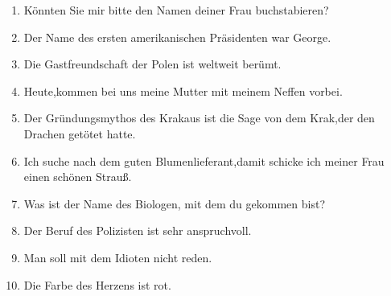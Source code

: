 \documentclass[a4paper,12pt]{article}
\begin{document}
\begin{enumerate}
    \item K\"onnten Sie mir bitte den Namen deiner Frau buchstabieren?
    \item Der Name des ersten amerikanischen Pr\"asidenten war George.
    \item Die Gastfreundschaft der Polen ist weltweit ber\"umt.
    \item Heute,kommen bei uns meine Mutter mit meinem Neffen vorbei.
    \item Der Gr\"undungsmythos des Krakaus ist die Sage von dem Krak,der den Drachen get\"otet hatte.
    \item Ich suche nach dem guten Blumenlieferant,damit schicke ich meiner Frau einen sch\"onen Strau\ss.
    \item Was ist der Name des Biologen, mit dem du gekommen bist?
    \item Der Beruf des Polizisten ist sehr anspruchvoll.
    \item Man soll mit dem Idioten nicht reden.
    \item Die Farbe des Herzens ist rot.
\end{enumerate}
\end{document}
